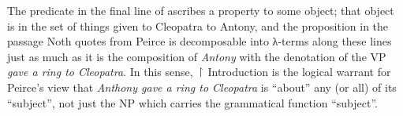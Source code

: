 \documentclass[output=paper,colorlinks,citecolor=brown]{langscibook}
\begin{document}
\begin{exe}
 \ex\label{cleopatra}
\end{exe}
The predicate in the final line of  ascribes a property to
some object; that object is in the set of things given to Cleopatra to
Antony, and the proposition in the passage Noth quotes from Peirce is
decomposable into λ-terms along these lines just as much as it is the
composition of \textit{Antony} with the denotation of the VP \textit{gave a ring to
Cleopatra}. In this sense, \ensuremath{\vs} Introduction is the logical warrant for
Peirce's view that \textit{Anthony gave a ring to Cleopatra} is ``about''
any (or all) of its ``subject'', not just the NP which carries the
grammatical function ``subject''.
\end{document}
